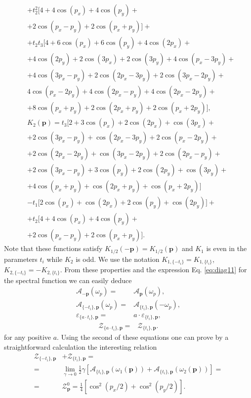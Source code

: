 \documentclass[aps,pra,reprint,showpacs,superscriptaddress]{revtex4-1}
\newcommand\bs[1]{\ensuremath{\boldsymbol{#1}}}
\begin{document}
\begin{align}
&+t_2^2\biggl[4+4\cos (p_x)+4\cos (p_y)+ \nonumber\\
&+2\cos (p_x-p_y)+2\cos (p_x+p_y)\biggr]+ \nonumber\\
&+t_2t_3\biggl[4+6\cos (p_x)+6\cos (p_y)+4\cos (2p_x)+ \nonumber\\
&+4\cos (2p_y)+2\cos (3p_x)+2\cos (3p_y)+4\cos (p_x-3p_y)+ \nonumber\\
&+4\cos (3p_x-p_y)+2\cos (2p_x-3p_y)+2\cos (3p_x-2p_y)+\nonumber\\
&4\cos (p_x-2p_y)+4\cos (2p_x-p_y)+4\cos (2p_x-2p_y)+ \nonumber\\
&+8\cos (p_x+p_y)+2\cos (2p_x+p_y)+2\cos (p_x+2p_y)\biggr], \nonumber\\
&K_2(\bs{p})=t_3\biggl[2+3\cos (p_x)+ 2\cos (2p_x)+\cos (3p_x)+ \nonumber\\
&+2\cos (3p_x-p_y)+\cos (2p_x-3p_y)+2\cos (p_x-2p_y)+ \nonumber\\
&+2\cos (2p_x-2p_y)+\cos (3p_x-2p_y)+2\cos (2p_x-p_y)+ \nonumber\\
&+2\cos (3p_x-p_y)+3\cos (p_y)+2\cos (2p_y)+\cos (3p_y)+ \nonumber\\
&+4\cos (p_x+p_y)+\cos (2p_x+p_y)+\cos (p_x+2p_y)\biggr] \nonumber\\
&-t_1\biggl[2\cos (p_x)+\cos (2p_x)+2\cos (p_y)+\cos (2p_y)\biggr]+ \nonumber\\
&+t_2\biggl[4+4\cos (p_x)+4\cos (p_y)+ \nonumber\\
&+2\cos (p_x-p_y)+2\cos (p_x+p_y)\biggr]. \nonumber
\end{align}
Note that these functions satisfy $K_{1/2}(-\bs{p})=K_{1/2}(\bs{p})$ and $K_1$ is even in the parameters $t_i$ while $K_2$ is odd. We use the notation $K_{1,\{-t_i\}}=K_{1,\{t_i\}}$, $K_{2,\{-t_i\}}=-K_{2,\{t_i\}}$. From these properties and the expression Eq. \eqref{eq:diag11} for the spectral function we can easily deduce
\begin{align}
\mathcal{A}_{-\bs{p}}(\omega_p)=&\mathcal{A}_{\bs{p}}(\omega_p), \label{Adiag4}\\
\mathcal{A}_{\{-t_i\},\bs{p}}(\omega_p)=&\mathcal{A}_{\{t_i\},\bs{p}}(-\omega_p), \nonumber\\
\varepsilon_{\{a\cdot t_i\},\bs{p}}=&a\cdot \varepsilon_{\{t_i\},\bs{p}}, \nonumber
\end{align}
\begin{align}
\mathcal{Z}_{\{a\cdot t_i\},\bs{p}}=&\mathcal{Z}_{\{t_i\},\bs{p}}. \nonumber
\end{align}
for any positive $a$. Using the second of these equations one can prove by a straightforward calculation the interesting relation
\begin{align}
\mathcal{Z}_{\{-t_i\},\bs{p}}&+\mathcal{Z}_{\{t_i\},\bs{p}}=\\
=&\lim_{\gamma\rightarrow 0}\frac{1}{2}\gamma\left[\mathcal{A}_{\{t_i\},\bs{p}}(\omega_1(\bs{p}))+\mathcal{A}_{\{t_i\},\bs{p}}(\omega_2(\bs{p}))\right]= \nonumber\\
=& \mathcal{Z}_{\bs{p}}^0=\frac{1}{4}\left[\cos^2 (p_x/2)+\cos^2 (p_y/2)\right]. \nonumber
\end{align}



\end{document}
